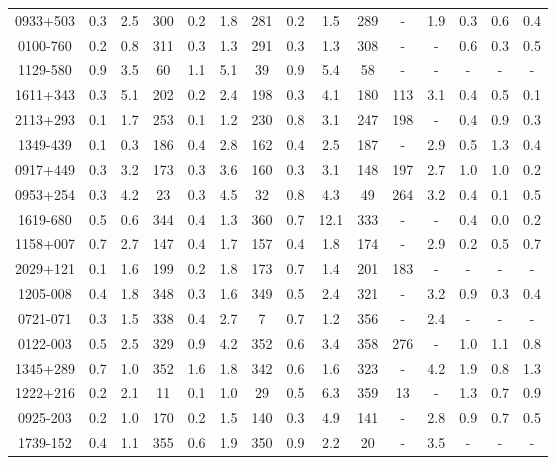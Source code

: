 \begin{table}
\begin{tabular}{ccccccccccccccc}
0933+503 & 0.3 & 2.5 & 300 & 0.2 & 1.8 & 281 & 0.2 & 1.5 & 289 & - & 1.9 & 0.3 & 0.6 & 0.4 \\
0100-760 & 0.2 & 0.8 & 311 & 0.3 & 1.3 & 291 & 0.3 & 1.3 & 308 & - & - & 0.6 & 0.3 & 0.5 \\
1129-580 & 0.9 & 3.5 & 60 & 1.1 & 5.1 & 39 & 0.9 & 5.4 & 58 & - & - & - & - & - \\
1611+343 & 0.3 & 5.1 & 202 & 0.2 & 2.4 & 198 & 0.3 & 4.1 & 180 & 113 & 3.1 & 0.4 & 0.5 & 0.1 \\
2113+293 & 0.1 & 1.7 & 253 & 0.1 & 1.2 & 230 & 0.8 & 3.1 & 247 & 198 & - & 0.4 & 0.9 & 0.3 \\
1349-439 & 0.1 & 0.3 & 186 & 0.4 & 2.8 & 162 & 0.4 & 2.5 & 187 & - & 2.9 & 0.5 & 1.3 & 0.4 \\
0917+449 & 0.3 & 3.2 & 173 & 0.3 & 3.6 & 160 & 0.3 & 3.1 & 148 & 197 & 2.7 & 1.0 & 1.0 & 0.2 \\
0953+254 & 0.3 & 4.2 & 23 & 0.3 & 4.5 & 32 & 0.8 & 4.3 & 49 & 264 & 3.2 & 0.4 & 0.1 & 0.5 \\
1619-680 & 0.5 & 0.6 & 344 & 0.4 & 1.3 & 360 & 0.7 & 12.1 & 333 & - & - & 0.4 & 0.0 & 0.2 \\
1158+007 & 0.7 & 2.7 & 147 & 0.4 & 1.7 & 157 & 0.4 & 1.8 & 174 & - & 2.9 & 0.2 & 0.5 & 0.7 \\
2029+121 & 0.1 & 1.6 & 199 & 0.2 & 1.8 & 173 & 0.7 & 1.4 & 201 & 183 & - & - & - & - \\
1205-008 & 0.4 & 1.8 & 348 & 0.3 & 1.6 & 349 & 0.5 & 2.4 & 321 & - & 3.2 & 0.9 & 0.3 & 0.4 \\
0721-071 & 0.3 & 1.5 & 338 & 0.4 & 2.7 & 7 & 0.7 & 1.2 & 356 & - & 2.4 & - & - & - \\
0122-003 & 0.5 & 2.5 & 329 & 0.9 & 4.2 & 352 & 0.6 & 3.4 & 358 & 276 & - & 1.0 & 1.1 & 0.8 \\
1345+289 & 0.7 & 1.0 & 352 & 1.6 & 1.8 & 342 & 0.6 & 1.6 & 323 & - & 4.2 & 1.9 & 0.8 & 1.3 \\
1222+216 & 0.2 & 2.1 & 11 & 0.1 & 1.0 & 29 & 0.5 & 6.3 & 359 & 13 & - & 1.3 & 0.7 & 0.9 \\
0925-203 & 0.2 & 1.0 & 170 & 0.2 & 1.5 & 140 & 0.3 & 4.9 & 141 & - & 2.8 & 0.9 & 0.7 & 0.5 \\
1739-152 & 0.4 & 1.1 & 355 & 0.6 & 1.9 & 350 & 0.9 & 2.2 & 20 & - & 3.5 & - & - & - \\
\end{tabular}
\end{table}
